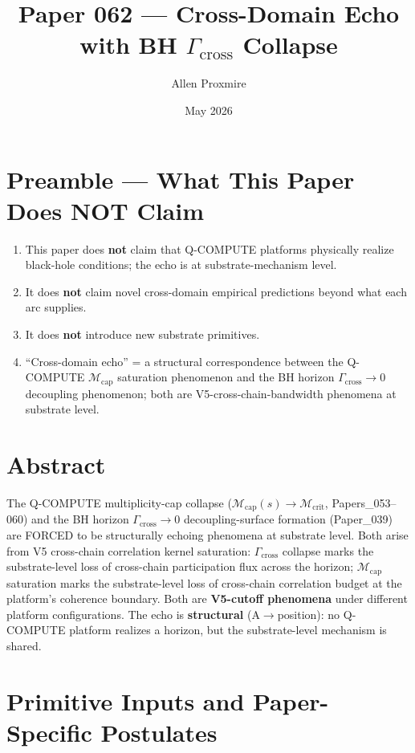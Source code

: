 \documentclass[11pt,a4paper]{article}
\title{\vspace{-1cm}\Large\bfseries Paper 062 --- Cross-Domain Echo with BH $\Gamma_\mathrm{cross}$ Collapse}
\author{Allen Proxmire}
\date{May 2026}
\begin{document}
\maketitle

\section*{Preamble --- What This Paper Does NOT Claim}

\begin{enumerate}[noitemsep]
\item This paper does \textbf{not} claim that Q-COMPUTE platforms physically realize black-hole conditions; the echo is at substrate-mechanism level.
\item It does \textbf{not} claim novel cross-domain empirical predictions beyond what each arc supplies.
\item It does \textbf{not} introduce new substrate primitives.
\item ``Cross-domain echo'' = a structural correspondence between the Q-COMPUTE $\mathcal{M}_\mathrm{cap}$ saturation phenomenon and the BH horizon $\Gamma_\mathrm{cross} \to 0$ decoupling phenomenon; both are V5-cross-chain-bandwidth phenomena at substrate level.
\end{enumerate}

\section*{Abstract}

The Q-COMPUTE multiplicity-cap collapse ($\mathcal{M}_\mathrm{cap}(s) \to \mathcal{M}_\mathrm{crit}$, Papers\_053--060) and the BH horizon $\Gamma_\mathrm{cross} \to 0$ decoupling-surface formation (Paper\_039) are FORCED to be structurally echoing phenomena at substrate level. Both arise from V5 cross-chain correlation kernel saturation: $\Gamma_\mathrm{cross}$ collapse marks the substrate-level loss of cross-chain participation flux across the horizon; $\mathcal{M}_\mathrm{cap}$ saturation marks the substrate-level loss of cross-chain correlation budget at the platform's coherence boundary. Both are \textbf{V5-cutoff phenomena} under different platform configurations. The echo is \textbf{structural} (A$\to$position): no Q-COMPUTE platform realizes a horizon, but the substrate-level mechanism is shared.

\section{Primitive Inputs and Paper-Specific Postulates}
\end{document}
